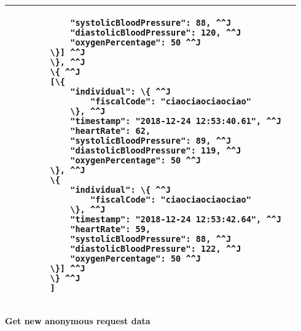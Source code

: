 \begin{tabularx}{\linewidth}{| l| l }
{\begin{lstlisting}
			"systolicBloodPressure": 88, ^^J
			"diastolicBloodPressure": 120, ^^J
			"oxygenPercentage": 50 ^^J
		\}] ^^J
		\}, ^^J
		\{ ^^J
		[\{
			"individual": \{ ^^J
				"fiscalCode": "ciaociaociaociao"
			\}, ^^J
			"timestamp": "2018-12-24 12:53:40.61", ^^J
			"heartRate": 62,
			"systolicBloodPressure": 89, ^^J
			"diastolicBloodPressure": 119, ^^J
			"oxygenPercentage": 50 ^^J
		\}, ^^J
		\{
			"individual": \{ ^^J
				"fiscalCode": "ciaociaociaociao"
			\}, ^^J
			"timestamp": "2018-12-24 12:53:42.64", ^^J
			"heartRate": 59,
			"systolicBloodPressure": 88, ^^J
			"diastolicBloodPressure": 122, ^^J
			"oxygenPercentage": 50 ^^J
		\}] ^^J
		\} ^^J
		]
	\end{lstlisting}
	} \\
	\hline
	\end{tabularx}
	
	\textbf{Get new anonymous request data} \\

